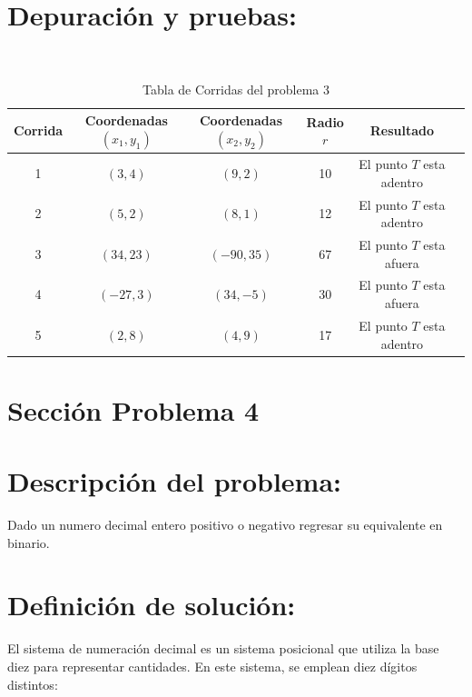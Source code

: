 \documentclass{IEEEcsmag}
\begin{document}
\section*{Depuración y pruebas:}
\begin{table}[h!]
     \centering
     \caption{Tabla de Corridas del problema 3}\\

     \begin{tabular}{|c|c|c|c|c|c|}
     \hline
    Corrida & Coordenadas $(x_{1}, y_{1})$& Coordenadas $(x_{2}, y_{2})$  &  Radio $r$ & Resultado\\
    \hline
    1  &  $(3,4)$ & $(9,2)$ & 10 & El punto $T$ esta adentro \\
    \hline
    2  &  $(5,2)$ & $(8,1)$ & 12 & El punto $T$ esta adentro \\
    \hline
    3  &  $(34,23)$ & $(-90,35)$ & 67 & El punto $T$ esta afuera \\
    \hline
    4  &  $(-27,3)$ & $(34,-5)$ & 30 & El punto $T$ esta afuera \\
    \hline
    5 &  $(2,8)$ & $(4,9)$ & 17 & El punto $T$ esta adentro \\
    \hline
     \end{tabular}
     \label{tab:my_label}
 \end{table}
\clearpage








\section{Sección Problema 4}
\section*{Descripción del problema:}
Dado un numero decimal entero positivo o negativo regresar su equivalente en binario.
\newline

\section*{Definición de solución:}

El sistema de numeración decimal es un sistema posicional que utiliza la base diez para representar cantidades. En este sistema, se emplean diez dígitos distintos:
\newline
\end{document}
